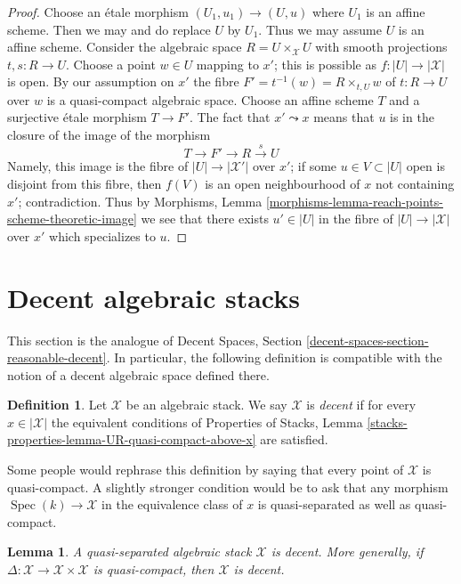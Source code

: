 \documentclass{stacks-project}
\theoremstyle{plain}
\newtheorem{lemma}[subsection]{Lemma}
\theoremstyle{definition}
\newtheorem{definition}[subsection]{Definition}
\theoremstyle{remark}
\numberwithin{equation}{subsection}
\def\Spec{\mathop{\mathrm{Spec}}}
\begin{document}
\begin{proof}
Choose an \'etale morphism $(U_1, u_1) \to (U, u)$ where $U_1$
is an affine scheme. Then we may and do replace $U$ by $U_1$.
Thus we may assume $U$ is an affine scheme.
Consider the algebraic space $R = U \times_\mathcal{X} U$
with smooth projections $t, s : R \to U$.
Choose a point $w \in U$ mapping to $x'$; this is possible as
$f : |U| \to |\mathcal{X}|$ is open.
By our assumption on $x'$ the fibre
$F' = t^{-1}(w) = R \times_{t, U} w$
of $t : R \to U$ over $w$ is a quasi-compact algebraic space.
Choose an affine scheme $T$ and a surjective \'etale morphism
$T \to F'$. The fact that $x' \leadsto x$ means that $u$ is in
the closure of the image of the morphism
$$
T \to F' \to R \xrightarrow{s} U
$$
Namely, this image is the fibre of $|U| \to |\mathcal{X}'|$
over $x'$; if some $u \in V \subset |U|$ open is disjoint
from this fibre, then $f(V)$ is an open neighbourhood of $x$
not containing $x'$; contradiction.
Thus by Morphisms, Lemma
\ref{morphisms-lemma-reach-points-scheme-theoretic-image}
we see that  there exists $u' \in |U|$ in the fibre
of $|U| \to |\mathcal{X}|$ over $x'$ which specializes to $u$.
\end{proof}



\section{Decent algebraic stacks}
\label{section-reasonable-decent}

\noindent
This section is the analogue of
Decent Spaces, Section \ref{decent-spaces-section-reasonable-decent}.
In particular, the following definition is compatible with
the notion of a decent algebraic space defined there.

\begin{definition}
\label{definition-decent}
Let $\mathcal{X}$ be an algebraic stack. We say $\mathcal{X}$ is {\it decent}
if for every $x \in |\mathcal{X}|$ the equivalent conditions of
Properties of Stacks, Lemma
\ref{stacks-properties-lemma-UR-quasi-compact-above-x} are satisfied.
\end{definition}

\noindent
Some people would rephrase this definition by saying that
every point of $\mathcal{X}$ is quasi-compact.
A slightly stronger condition would be to ask that any morphism
$\Spec(k) \to \mathcal{X}$ in the equivalence class of $x$ is
quasi-separated as well as quasi-compact.

\begin{lemma}
\label{lemma-quasi-separated-decent}
A quasi-separated algebraic stack $\mathcal{X}$ is decent.
More generally, if $\Delta : \mathcal{X} \to \mathcal{X} \times \mathcal{X}$
is quasi-compact, then $\mathcal{X}$ is decent.
\end{lemma}
\end{document}

